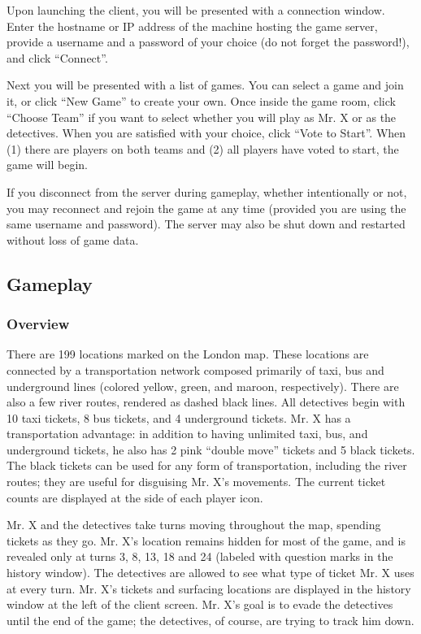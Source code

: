 \documentclass[11pt,notitlepage]{article}
\begin{document}
Upon launching the client, you will be presented with a connection window.  Enter
the hostname or IP address of the machine hosting the game server, provide a username
and a password of your choice (do not forget the password!), and click ``Connect''.

Next you will be presented with a list of games.  You can select a game and
join it, or click ``New Game'' to create your own.  Once inside the game room,
click ``Choose Team'' if you want to select whether you will play as Mr. X or as the
detectives.  When you are satisfied with your choice, click ``Vote to Start''.
When (1) there are players on both teams and (2) all players have voted to
start, the game will begin.

If you disconnect from the server during gameplay, whether intentionally or not, you
may reconnect and rejoin the game at any time (provided you are using the same
username and password).  The server may also be shut down and restarted without loss of
game data.

\subsection*{Gameplay}
\subsubsection*{Overview}
There are 199 locations marked on the London map.  These locations are connected by a
transportation network composed primarily of taxi, bus and underground lines (colored 
yellow, green, and maroon, respectively).  There are also a few river routes,
rendered as dashed black lines.  All detectives begin with 10 taxi tickets, 8
bus tickets, and 4 underground tickets.  Mr. X has a transportation advantage:
in addition to having unlimited taxi, bus, and underground tickets, he also has
2 pink ``double move'' tickets and 5 black tickets.  The black tickets can be
used for any form of transportation, including the river routes; they are
useful for disguising Mr. X's movements.  The current ticket counts are
displayed at the side of each player icon.

Mr. X and the detectives take turns moving throughout the map, spending tickets
as they go.  Mr. X's location remains hidden for most of the game, and is
revealed only at turns 3, 8, 13, 18 and 24 (labeled with question marks in the
history window).  The detectives are allowed to see what type of ticket Mr. X
uses at every turn.  Mr. X's tickets and surfacing locations are displayed in
the history window at the left of the client screen.  Mr. X's goal is to evade
the detectives until the end of the game; the detectives, of course, are trying
to track him down.
\end{document}
